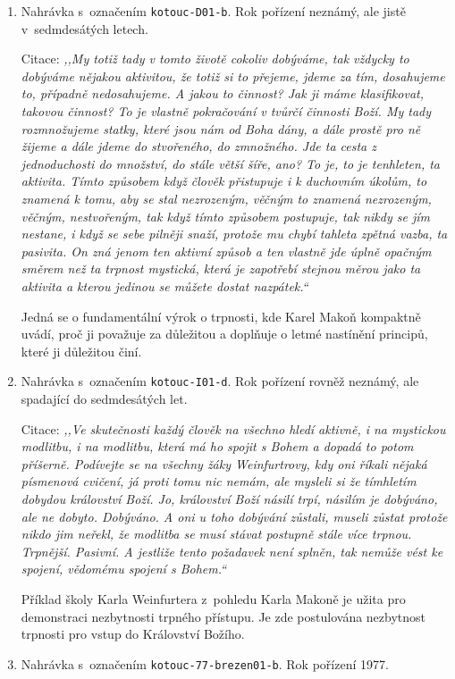 \begin{enumerate}
  \item{
    Nahrávka s~označením \texttt{kotouc-D01-b}. Rok pořízení neznámý, ale
    jistě v~sedmdesátých letech.

    Citace: \textit{%
      ,,My totiž tady v tomto životě cokoliv dobýváme, tak vždycky to dobýváme
      nějakou aktivitou, že totiž si to přejeme, jdeme za tím, dosahujeme to,
      případně nedosahujeme. A jakou to činnost? Jak ji máme klasifikovat,
      takovou činnost? To je vlastně pokračování v tvůrčí činnosti Boží. My tady
      rozmnožujeme statky, které jsou nám od Boha dány, a dále prostě pro ně
      žijeme a dále jdeme do stvořeného, do zmnožného. Jde ta cesta z
      jednoduchosti do množství, do stále větší šíře, ano? To je, to je
      tenhleten, ta aktivita. Tímto způsobem když člověk přistupuje i k
      duchovním úkolům, to znamená k tomu, aby se stal nezrozeným, věčným to
      znamená nezrozeným, věčným, nestvořeným, tak když tímto způsobem
      postupuje, tak nikdy se jím nestane, i když se sebe pilněji snaží, protože
      mu chybí tahleta zpětná vazba, ta pasivita. On zná jenom ten aktivní
      způsob a ten vlastně jde úplně opačným směrem než ta trpnost mystická,
      která je zapotřebí stejnou měrou jako ta aktivita a kterou jedinou se
      můžete dostat nazpátek.``
    }

    Jedná se o fundamentální výrok o trpnosti, kde Karel Makoň kompaktně uvádí,
    proč ji považuje za důležitou a doplňuje o letmé nastínění principů, které
    ji důležitou činí.
  }
  \item{
    Nahrávka s~označením \texttt{kotouc-I01-d}. Rok pořízení rovněž neznámý, ale
    spadající do sedmdesátých let.

    Citace: \textit{%
      ,,Ve skutečnosti každý člověk na všechno hledí aktivně, i na mystickou
      modlitbu, i na modlitbu, která má ho spojit s Bohem a dopadá to potom
      příšerně. Podívejte se na všechny žáky Weinfurtrovy, kdy oni říkali
      nějaká písmenová cvičení, já proti tomu nic nemám, ale mysleli si že
      tímhletím dobydou království Boží. Jo, království Boží násilí trpí,
      násilím je dobýváno, ale ne dobyto. Dobýváno. A oni u toho dobývání
      zůstali, museli zůstat protože nikdo jim neřekl, že modlitba se musí
      stávat postupně stále více trpnou. Trpnější. Pasivní. A jestliže tento
      požadavek není splněn, tak nemůže vést ke spojení, vědomému spojení s
      Bohem.``
    }

    Příklad školy Karla Weinfurtera z~pohledu Karla Makoně je užita pro
    demonstraci nezbytnosti trpného přístupu. Je zde postulována nezbytnost
    trpnosti pro vstup do Království Božího.
  }
  \item{
      Nahrávka s~označením \texttt{kotouc-77-brezen01-b}. Rok pořízení 1977.

}
\end{enumerate}
